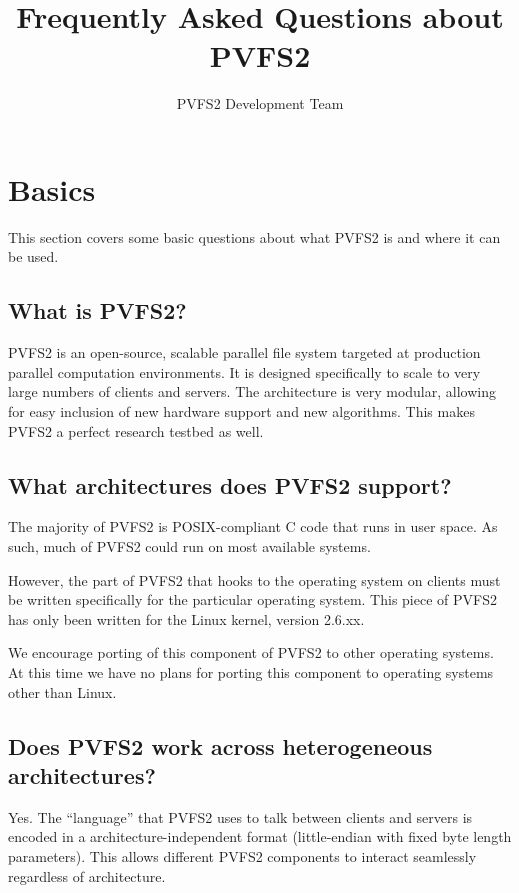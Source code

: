 \documentclass[11pt,letterpaper]{article}
\title{Frequently Asked Questions about PVFS2}
\author{ PVFS2 Development Team }
\begin{document}
\maketitle

\tableofcontents

\thispagestyle{empty}

%
%
\section{Basics}

This section covers some basic questions about what PVFS2 is and where it can
be used.

\subsection{What is PVFS2?}

PVFS2 is an open-source, scalable parallel file system targeted at production
parallel computation environments.  It is designed specifically to scale to
very large numbers of clients and servers.  The architecture is very modular,
allowing for easy inclusion of new hardware support and new algorithms.  This
makes PVFS2 a perfect research testbed as well.

\subsection{What architectures does PVFS2 support?}
\label{sec:supported-architectures}

The majority of PVFS2 is POSIX-compliant C code that runs in user space.  As
such, much of PVFS2 could run on most available systems.

However, the part of PVFS2 that hooks to the operating system on clients must
be written specifically for the particular operating system.  This piece of
PVFS2 has only been written for the Linux kernel, version 2.6.xx.

We encourage porting of this component of PVFS2 to other operating systems.
At this time we have no plans for porting this component to operating systems
other than Linux.

\subsection{Does PVFS2 work across heterogeneous architectures?}

Yes.  The ``language'' that PVFS2 uses to talk between clients and servers is
encoded in a architecture-independent format (little-endian with fixed byte
length parameters).  This allows different PVFS2 components to interact
seamlessly regardless of architecture.
\end{document}
